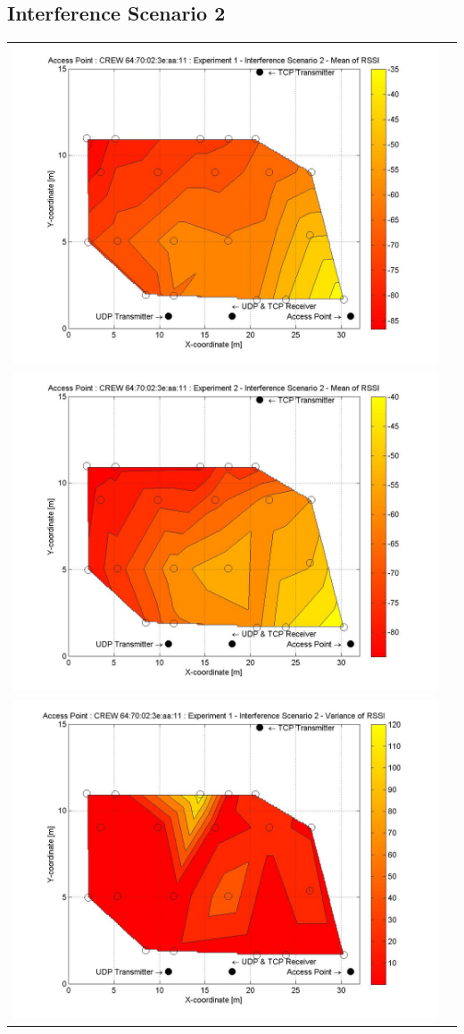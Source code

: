 \documentclass[11pt,a4paper,headinclude,footinclude,chapterprefix=on]{scrreprt}
\begin{document}
\subsection{Interference Scenario 2} 
\begin{longtable}
	{lr} 
	\includegraphics[width=13cm]{../../Source/plot/CREW_11/11_Wifi_Ex_1_Mean.jpg} \\
	\includegraphics[width=13cm]{../../Source/plot/CREW_11/11_Wifi_Ex_2_Mean.jpg} \\
	\includegraphics[width=13cm]{../../Source/plot/CREW_11/11_Wifi_Ex_1_Variance.jpg} \\

\end{longtable}
\end{document}

